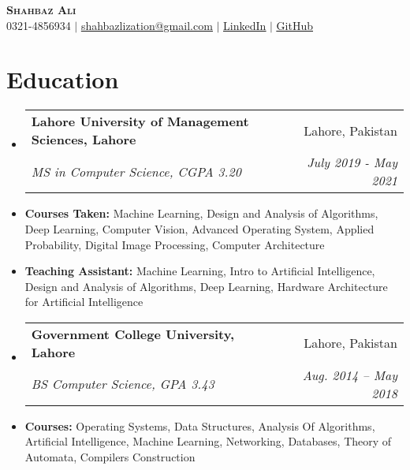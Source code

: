 \documentclass[letterpaper,11pt]{article}
\makeatletter
\newcommand{\resumeSubheading}[4]{
  \vspace{-2pt}\item
    \begin{tabular*}{0.97\textwidth}[t]{l@{\extracolsep{\fill}}r}
      \textbf{#1} & #2 \\
      \textit{\small#3} & \textit{\small #4} \\
    \end{tabular*}\vspace{-7pt}
}
\newcommand{\resumeSubHeadingListStart}{\begin{itemize}[leftmargin=0.15in, label={}]}
\newcommand{\resumeSubHeadingListEnd}{\end{itemize}}
\makeatother
\begin{document}

\begin{center}
    \textbf{\Huge \scshape Shahbaz Ali} \\ \vspace{5pt}
    \small 0321-4856934 $|$ \href{mailto:shahbazlization@gmail.com}{\underline{shahbazlization@gmail.com}} $|$ 
    \href{https://www.linkedin.com/in/shahbaz-ali-720887123/}{\underline{LinkedIn}} $|$
    \href{https://github.com/cricketjanoon?tab=repositories}{\underline{GitHub}}
\end{center}


\section{Education}
  \resumeSubHeadingListStart
    \resumeSubheading
      {Lahore University of Management Sciences, Lahore}{Lahore, Pakistan}
      {MS in Computer Science, CGPA 3.20}{July 2019 - May 2021}
      \item \textbf{Courses Taken:} Machine Learning, Design and Analysis of Algorithms, Deep Learning, Computer Vision, Advanced Operating System, Applied Probability, Digital Image Processing, Computer Architecture
      \vspace{-0.25cm}
      \item \textbf{Teaching Assistant:} Machine Learning, Intro to Artificial Intelligence, Design and Analysis of Algorithms, Deep Learning, Hardware Architecture for Artificial Intelligence
      
    \resumeSubheading
      {Government College University, Lahore}{Lahore, Pakistan}
      {BS Computer Science, GPA 3.43}{Aug. 2014 -- May 2018}
      \item \textbf{Courses:} Operating Systems, Data Structures, Analysis Of Algorithms, Artificial Intelligence, Machine Learning, Networking, Databases, Theory of Automata, Compilers Construction
  \resumeSubHeadingListEnd


\end{document}
